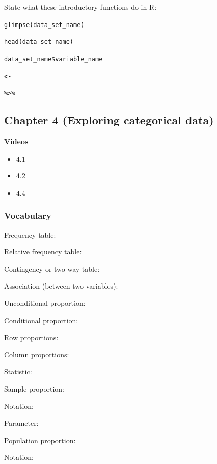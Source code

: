 \documentclass[
]{report}
\providecommand{\tightlist}{%
  \setlength{\itemsep}{0pt}\setlength{\parskip}{0pt}}
\newcommand{\rgs}{\vspace{12pt}} %
\newcommand{\rgi}{\hspace{24pt}}  %
\begin{document}
State what these introductory functions do in R:

\texttt{glimpse(data\_set\_name)}

\texttt{head(data\_set\_name)}

\texttt{data\_set\_name\$variable\_name}

\texttt{\textless{}-}

\texttt{\%\textgreater{}\%}

\hypertarget{chapter-4-exploring-categorical-data}{%
\subsection*{Chapter 4 (Exploring categorical data)}\label{chapter-4-exploring-categorical-data}}


\textbf{Videos}

\begin{itemize}
\tightlist
\item
  4.1
\item
  4.2
\item
  4.4
\end{itemize}


\hypertarget{vocabulary-3}{%
\subsubsection*{Vocabulary}\label{vocabulary-3}}

Frequency table:
\rgs

Relative frequency table:
\rgs

Contingency or two-way table:
\rgs

Association (between two variables):
\rgs

Unconditional proportion:
\rgs

Conditional proportion:
\rgs

\rgi Row proportions:
\rgs

\rgi Column proportions:
\rgs

Statistic:
\rgs

\rgi Sample proportion:
\rgs

\rgi \rgi Notation:
\rgs

Parameter:
\rgs

\rgi Population proportion:
\rgs

\rgi \rgi Notation:
\rgs
\end{document}
